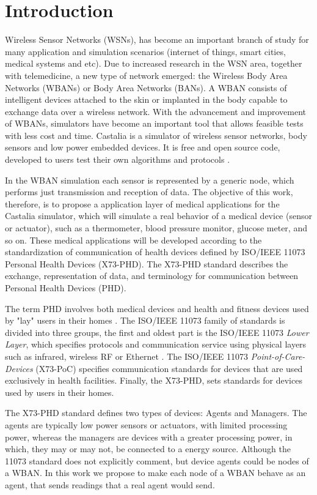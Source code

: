 \section{Introduction}

Wireless Sensor Networks (WSNs), has become an important branch of study for many application and simulation scenarios (internet of things, smart cities, medical systems and etc). Due to increased research in the WSN area, together with telemedicine, a new type of network emerged: the Wireless Body Area Networks (WBANs) or Body Area Networks (BANs). A WBAN consists of intelligent devices attached to the skin or implanted in the body capable to exchange data over a wireless network. With the advancement and improvement of WBANs, simulators have become an important tool that allows feasible tests with less cost and time. Castalia is a simulator of wireless sensor networks, body sensors and low power embedded devices. It is free and open source code, developed to users test their own algorithms and protocols \cite{b15}. 

In the WBAN simulation each sensor is represented by a generic node, which performs just transmission and reception of data. The objective of this work, therefore, is to propose a application layer of medical applications for the Castalia simulator, which will simulate a real behavior of a medical device (sensor or actuator), such as a thermometer, blood pressure monitor, glucose meter, and so on. These medical applications will be developed according to the standardization of communication of health devices defined by ISO/IEEE 11073 Personal Health Devices (X73-PHD). The X73-PHD standard describes the exchange, representation of data, and terminology for communication between Personal Health Devices (PHD).

The term PHD involves both medical devices and health and fitness devices used by "lay" users in their homes \cite{b3}. The ISO/IEEE 11073 family of standards is divided into three groups, the first and oldest part is the ISO/IEEE 11073 \textit{Lower Layer}, which specifies protocols and communication service using physical layers such as infrared, wireless RF or Ethernet \cite{b16}. The ISO/IEEE 11073 \textit{Point-of-Care-Devices} (X73-PoC) specifies communication standards for devices that are used exclusively in health facilities. Finally, the X73-PHD, sets standards for devices used by users in their homes.

The X73-PHD standard defines two types of devices: Agents and Managers. The agents are typically low power sensors or actuators, with limited processing power, whereas the managers are devices with a greater processing power, in which, they may or may not, be connected to a energy source. Although the 11073 standard does not explicitly comment, but device agents could be nodes of a WBAN. In this work we propose to make each node of a WBAN behave as an agent, that sends readings that a real agent would send.

